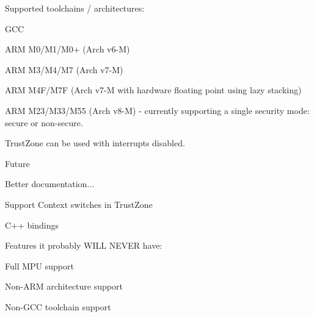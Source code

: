 Supported toolchains / architectures\+:
\begin{DoxyItemize}
\item G\+CC
\item A\+RM M0/\+M1/\+M0+ (Arch v6-\/M)
\item A\+RM M3/\+M4/\+M7 (Arch v7-\/M)
\item A\+RM M4\+F/\+M7F (Arch v7-\/M with hardware floating point using lazy stacking)
\item A\+RM M23/\+M33/\+M55 (Arch v8-\/M) -\/ currently supporting a single security mode\+: secure or non-\/secure.
\item Trust\+Zone can be used with interrupts disabled.
\end{DoxyItemize}

Future
\begin{DoxyItemize}
\item Better documentation...
\item Support Context switches in Trust\+Zone
\item C++ bindings
\end{DoxyItemize}

Features it probably W\+I\+LL N\+E\+V\+ER have\+:
\begin{DoxyItemize}
\item Full M\+PU support
\item Non-\/\+A\+RM architecture support
\item Non-\/\+G\+CC toolchain support 
\end{DoxyItemize}